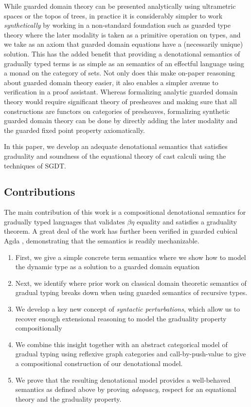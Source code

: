While guarded domain theory can be presented analytically using
ultrametric spaces or the topos of trees, in practice it is
considerably simpler to work \emph{synthetically} by working in a
non-standard foundation such as guarded type theory where the later
modality is taken as a primitive operation on types, and we take as an
axiom that guarded domain equations have a (necessarily unique)
solution. This has the added benefit that providing a denotational
semantics of gradually typed terms is as simple as an semantics of an
effectful language using a monad on the category of sets. Not only
does this make on-paper reasoning about guarded domain theory easier,
it also enables a simpler avenue to verification in a proof
assistant. Whereas formalizing analytic guarded domain theory would
require significant theory of presheaves and making sure that all
constructions are functors on categories of presheaves, formalizing
synthetic guarded domain theory can be done by directly adding the
later modality and the guarded fixed point property axiomatically.
%



In this paper, we develop an adequate denotational semantics that satisfies
graduality and soundness of the equational theory of cast calculi using the
techniques of SGDT.  


\subsection{Contributions}

The main contribution of this work is a compositional denotational
semantics for gradually typed languages that validates $\beta\eta$
equality and satisfies a graduality theorem. A great deal of the work
has further been verified in guarded cubical Agda \cite{veltri-vezzosi2020}, 
demonstrating that the semantics is readily mechanizable.

\begin{enumerate}
\item First, we give a simple concrete term semantics where we show
  how to model the dynamic type as a solution to a guarded domain equation
\item Next, we identify where prior work on classical domain theoretic
  semantics of gradual typing breaks down when using guarded semantics
  of recursive types.
\item We develop a key new concept of \emph{syntactic perturbations},
  which allow us to recover enough extensional reasoning to model the
  graduality property compositionally
\item We combine this insight together with an abstract categorical
  model of gradual typing using reflexive graph categories and
  call-by-push-value to give a compositional construction of our
  denotational model.
\item We prove that the resulting denotational model provides a
  well-behaved semantics as defined above by proving \emph{adequacy},
  respect for an equational theory and the graduality property.
\end{enumerate}

